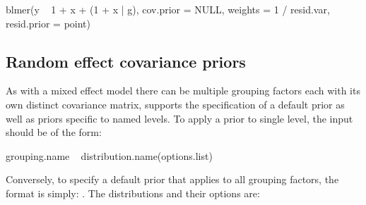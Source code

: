 \documentclass[article,shortnames]{jss}
\begin{document}
\begin{Code}
blmer(y ~ 1 + x + (1 + x | g), cov.prior = NULL,
      weights = 1 / resid.var,
      resid.prior = point)
\end{Code}

\subsection{Random effect covariance priors}
\label{sec:blme:covPriors}

As with a mixed effect model there can be multiple
grouping factors each with its own distinct covariance matrix,
 supports the specification of a default prior as well as
priors specific to named levels. To apply a prior to single level, the
input should be of the form:

\begin{Code}
  grouping.name ~ distribution.name(options.list)
\end{Code}

Conversely, to specify a default prior that applies to all grouping
factors, the format is simply:
. The distributions and their
options are:
\end{document}
